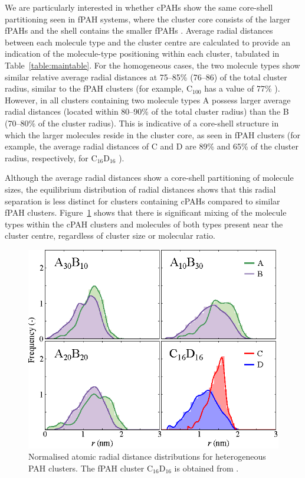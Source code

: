 We are particularly interested in whether cPAHs show the same core-shell partitioning seen in fPAH systems, where the cluster core consists of the larger fPAHs and the shell contains the smaller fPAHs \cite{bowal2018partitioning}. Average radial distances between each molecule type and the cluster centre are calculated to provide an indication of the molecule-type positioning within each cluster, tabulated in  Table~\ref{table:maintable}. For the homogeneous cases, the two molecule types show similar relative average radial distances at 75--85\% (76--86) of the total cluster radius, similar to the fPAH clusters (for example, $\text{C}_{\text{100}}$ has a value of 77\% \cite{chen2014size}). However, in all clusters containing two molecule types A possess larger average radial distances (located within 80--90\% of the total cluster radius) than the B (70--80\% of the cluster radius). This is indicative of a core-shell structure in which the larger molecules reside in the cluster core, as seen in fPAH clusters (for example, the average radial distances of C and D are 89\% and 65\% of the cluster radius, respectively, for $\text{C}_{\text{16}}\text{D}_{\text{16}}$ \cite{bowal2018partitioning}).

Although the average radial distances show a core-shell partitioning of molecule sizes, the equilibrium distribution of radial distances shows that this radial separation is less distinct for clusters containing cPAHs compared to similar fPAH clusters. Figure~\ref{fig:radialdists_atomic} shows that there is significant mixing of the molecule types within the cPAH clusters and molecules of both types present near the cluster centre, regardless of cluster size or molecular ratio.
%
\begin{figure}[!tbh]
\centering
\includegraphics[width=0.6\linewidth]{Figures/radii_histograms_aa.eps}
\caption{Normalised atomic radial distance distributions for heterogeneous PAH clusters. The fPAH cluster $\text{C}_{\text{16}}\text{D}_{\text{16}}$ is obtained from \citet{bowal2018partitioning}.}
\label{fig:radialdists_atomic}
\end{figure}
%

